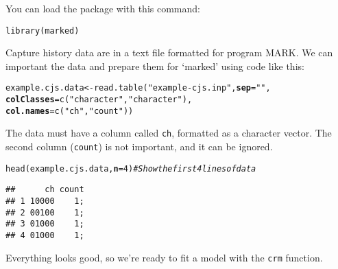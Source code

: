 \documentclass[12pt]{article}\usepackage[]{graphicx}\usepackage[]{xcolor}
\makeatletter
\newcommand{\hlnum}[1]{\textcolor[rgb]{0.69,0.494,0}{#1}}%
\newcommand{\hlsng}[1]{\textcolor[rgb]{0.749,0.012,0.012}{#1}}%
\newcommand{\hlcom}[1]{\textcolor[rgb]{0.514,0.506,0.514}{\textit{#1}}}%
\newcommand{\hldef}[1]{\textcolor[rgb]{0,0,0}{#1}}%
\newcommand{\hlkwb}[1]{\textcolor[rgb]{0,0.341,0.682}{#1}}%
\newcommand{\hlkwc}[1]{\textcolor[rgb]{0,0,0}{\textbf{#1}}}%
\newcommand{\hlkwd}[1]{\textcolor[rgb]{0.004,0.004,0.506}{#1}}%
\newenvironment{kframe}{%
 \def\at@end@of@kframe{}%
 \ifinner\ifhmode%
  \def\at@end@of@kframe{\end{minipage}}%
  \begin{minipage}{\columnwidth}%
 \fi\fi%
 \def\FrameCommand##1{\hskip\@totalleftmargin \hskip-\fboxsep
 \colorbox{shadecolor}{##1}\hskip-\fboxsep
     \hskip-\linewidth \hskip-\@totalleftmargin \hskip\columnwidth}%
 \MakeFramed {\advance\hsize-\width
   \@totalleftmargin\z@ \linewidth\hsize
   \@setminipage}}%
 {\par\unskip\endMakeFramed%
 \at@end@of@kframe}
\newenvironment{knitrout}{}{} %
\newcommand{\inr}[1]{\colorbox{inlinecolor}{\texttt{#1}}}
\makeatother
\begin{document}
You can load the package with this command:

\begin{knitrout}
\color{fgcolor}\begin{kframe}
\begin{alltt}
\hlkwd{library}\hldef{(marked)}
\end{alltt}
\end{kframe}
\end{knitrout}

Capture history data are in a text file formatted for program MARK. We
can important the data and prepare them for `marked' using code like
this: 

\begin{knitrout}
\color{fgcolor}\begin{kframe}
\begin{alltt}
\hldef{example.cjs.data} \hlkwb{<-} \hlkwd{read.table}\hldef{(}\hlsng{"example-cjs.inp"}\hldef{,} \hlkwc{sep}\hldef{=}\hlsng{" "}\hldef{,}
                               \hlkwc{colClasses}\hldef{=}\hlkwd{c}\hldef{(}\hlsng{"character"}\hldef{,}\hlsng{"character"}\hldef{),}
                               \hlkwc{col.names}\hldef{=}\hlkwd{c}\hldef{(}\hlsng{"ch"}\hldef{,} \hlsng{"count"}\hldef{))}
\end{alltt}
\end{kframe}
\end{knitrout}

The data must have a column called \inr{ch}, formatted as a character
vector. The second column (\inr{count}) is not important, and it
can be ignored.

\begin{knitrout}
\color{fgcolor}\begin{kframe}
\begin{alltt}
\hlkwd{head}\hldef{(example.cjs.data,} \hlkwc{n}\hldef{=}\hlnum{4}\hldef{)} \hlcom{# Show the first 4 lines of data}
\end{alltt}
\begin{verbatim}
##      ch count
## 1 10000    1;
## 2 00100    1;
## 3 01000    1;
## 4 01000    1;
\end{verbatim}
\end{kframe}
\end{knitrout}

Everything looks good, so we're ready to fit a model with the
\inr{crm} function. 
\end{document}
